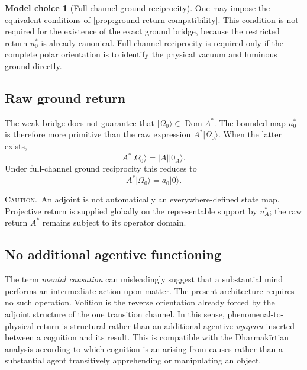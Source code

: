 \documentclass[11pt,reqno]{scrartcl}
\newcommand{\absA}{|A|}
\newcommand{\uzero}{u_{0}}
\newcommand{\ket}[1]{\lvert #1\rangle}
\DeclareMathOperator{\Dom}{Dom}
\newcommand{\warninglabel}{\par\smallskip\noindent\textsc{Caution.}\ }
\theoremstyle{plain}
\theoremstyle{definition}
\newtheorem{modelchoice}[modelchoice]{Model choice}
\theoremstyle{remark}
\begin{document}
\begin{modelchoice}[Full-channel ground reciprocity]
\label{choice:full-ground-reciprocity}
One may impose the equivalent conditions of
\cref{prop:ground-return-compatibility}.  This condition is not required for
the existence of the exact ground bridge, because the restricted return
$\uzero^*$ is already canonical.  Full-channel reciprocity is required only
if the complete polar orientation is to identify the physical vacuum and
luminous ground directly.
\end{modelchoice}

\subsection{Raw ground return}

The weak bridge does not guarantee that $\ket{\Omega_0}\in\Dom A^*$.  The
bounded map $\uzero^*$ is therefore more primitive than the raw expression
$A^*\ket{\Omega_0}$.  When the latter exists,
\begin{equation}
  A^*\ket{\Omega_0}
  =\absA\ket{0_A}.
  \label{eq:raw-ground-return-general}
\end{equation}
Under full-channel ground reciprocity this reduces to
\begin{equation}
  A^*\ket{\Omega_0}=a_0\ket0.
  \label{eq:raw-ground-return-strong}
\end{equation}

\warninglabel An adjoint is not automatically an everywhere-defined state
map.  Projective return is supplied globally on the representable support by
$u_A^*$; the raw return $A^*$ remains subject to its operator domain.

\subsection{No additional agentive functioning}

The term \emph{mental causation} can misleadingly suggest that a substantial
mind performs an intermediate action upon matter.  The present architecture
requires no such operation.  Volition is the reverse orientation already
forced by the adjoint structure of the one transition channel.  In this
sense, phenomenal-to-physical return is structural rather than an additional
agentive \emph{vy\=ap\=ara} inserted between a cognition and its result.  This is
compatible with the Dharmak\=irtian analysis according to which cognition is
an arising from causes rather than a substantial agent transitively
apprehending or manipulating an object.
\end{document}
